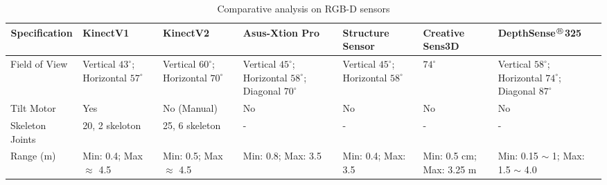 \clearpage
\begin{landscape}
\Centering
\small
\begin{table}
\scriptsize
\caption{Comparative analysis on RGB-D sensors}
\label{table:rgbd_sensors}
\begin{tabularx}{600pt}{c*6{X}}
\toprule
  \textbf{Specification} & \textbf{KinectV1\footnotemark[1]} 
                         & \textbf{KinectV2\footnotemark[1]} 
                         & \textbf{Asus-Xtion Pro\footnotemark[2]} 
                         & \textbf{Structure Sensor\footnotemark[3]}
                         & \textbf{Creative Sens3D\footnotemark[4]} 
                         &  \textbf{DepthSense$^{\regmark}$325\footnotemark[5]} 
  \tabularnewline \midrule
  
  \multicolumn{1}{l}{Field of View}       & Vertical $43^{\circ}$; Horizontal $57^{\circ}$  
                                          & Vertical $60^{\circ}$; Horizontal $70^{\circ}$ 
                                          & Vertical $45^{\circ}$; Horizontal $58^{\circ}$; Diagonal $70^{\circ}$
                                          & Vertical $45^{\circ}$; Horizontal $58^{\circ}$ 
                                          & $74^{\circ}$
                                          & Vertical $58^{\circ}$; Horizontal $74^{\circ}$; Diagonal $87^{\circ}$
                                          \tabularnewline\midrule
                                          
  \multicolumn{1}{l}{Tilt Motor}          & Yes
  										 & No (Manual)
  										 & No 
  										 & No 
  										 & No
  										 & No 
  										 \tabularnewline\midrule
  										 
  \multicolumn{1}{l}{Skeleton Joints}     & 20, 2 skeloton
  										 & 25, 6 skeleton
  										 & - 
  										 & - 
  										 & - 
  										 & - 
  										 \tabularnewline\midrule										 
  
  		 
  \multicolumn{1}{l}{Range (m)}           & Min: 0.4; Max $\approx$ 4.5 
  										 & Min: 0.5; Max $\approx$ 4.5
  										 & Min: 0.8; Max: 3.5
  										 & Min: 0.4; Max: 3.5  %
  										 & Min: 0.5 cm; Max: 3.25 m %
  										 & Min: 0.15 $\sim$ 1; Max: 1.5 $\sim$ 4.0 
  										 \tabularnewline\midrule
  										 										 

\end{tabularx}
\end{table}
\end{landscape}
